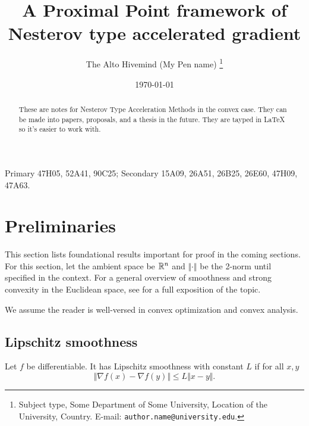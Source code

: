 \documentclass[12pt]{article}
\begin{document}
\title{{\selectfont A Proximal Point framework of Nesterov type accelerated gradient}}

\author{
    The Alto Hivemind (My Pen name)
    \thanks{
        Subject type, Some Department of Some University, Location of the University,
        Country. E-mail: \texttt{author.name@university.edu}.
    }
}

\date{\today}

\maketitle


\begin{abstract} 
    \noindent
    These are notes for Nesterov Type Acceleration Methods in the convex case. 
    They can be made into papers, proposals, and a thesis in the future. 
    They are tayped in \LaTeX\; so it's easier to work with. 
\end{abstract}
Primary 47H05, 52A41, 90C25; Secondary 15A09, 26A51, 26B25, 26E60, 47H09, 47A63.

\pagebreak
\tableofcontents
\pagebreak
\section{Preliminaries}
    This section lists foundational results important for proof in the coming sections. 
    For this section, let the ambient space be $\mathbb R^n$ and $\Vert \cdot\Vert$ be the 2-norm until specified in the context. 
    For a general overview of smoothness and strong convexity in the Euclidean space, see \cite[theorem 2.1.5, theorem 2.1.10]{nesterov_lectures_2018} for a full exposition of the topic. 
    \par\noindent
    We assume the reader is well-versed in convex optimization and convex analysis. 
    \subsection{Lipschitz smoothness}
        \begin{definition}
            Let $f$ be differentiable. 
            It has Lipschitz smoothness with constant $L$ if for all $x, y$
            $$
                \Vert \nabla f(x) - \nabla f(y)\Vert 
                \le 
                L \Vert x - y\Vert. 
            $$    
        \end{definition}
\end{document}
